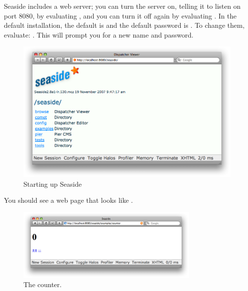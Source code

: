 \documentclass[a4paper,10pt,twoside]{book}
\begin{document}
Seaside includes a web server; you can turn the server on, telling it to listen on port 8080, by evaluating  ,
and you can turn it off again by evaluating .
In the default installation, the default  is  and the default password is .
To change them, evaluate:  .
This will prompt you for a new name and password.


\begin{figure}[tbh]
\begin{center}
\includegraphics[width=\textwidth]{seasideStartup}
\caption{Starting up Seaside
}
\end{center}
\end{figure}


\noindent
You should see a web page that looks like .

\noindent
{}


\begin{figure}[htb]
\begin{center}
\includegraphics[width=0.8\textwidth]{counter}
\caption{The counter.}
\end{center}
\end{figure}
\end{document}
